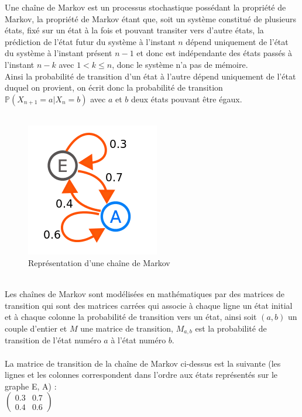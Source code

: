 \documentclass[final, 10pt]{report}
\begin{document}
Une chaîne de Markov est un processus stochastique possédant la propriété de Markov, la propriété de Markov étant que, soit un système constitué de plusieurs états, fixé sur un état à la fois et pouvant transiter vers d'autre états, la prédiction de l'état futur du système à l'instant $n$ dépend uniquement de l'état du système à l'instant présent $n-1$ et donc est indépendante des états passés à l'instant $n-k$ avec $1<k\leq n$, donc le système n'a pas de mémoire.\\
Ainsi la probabilité de transition d'un état à l'autre dépend uniquement de l'état duquel on provient, on écrit donc la probabilité de transition $\mathbb{P}(X_{n+1}=a | X_{n}=b)$ avec $a$ et $b$ deux états pouvant être égaux.\\
\\
\begin{figure}[!h]
    \centering
    \includegraphics[scale=0.5]{img/markovChaine.png}
    \caption{Représentation d'une chaîne de Markov}
    \label{fig:chaine_markov}
\end{figure}
\\
Les chaînes de Markov sont modélisées en mathématiques par des matrices de transition qui sont des matrices carrées qui associe à chaque ligne un état initial et à chaque colonne la probabilité de transition vers un état, ainsi soit $(a,b)$ un couple d'entier et $M$ une matrice de transition, $M_{a,b}$ est la probabilité de transition de l'état numéro $a$ à l'état numéro $b$.\\
\\
La matrice de transition de la chaîne de Markov ci-dessus est la suivante (les lignes et les colonnes correspondent dans l'ordre aux états représentés sur le graphe E, A) : 
\\
$\begin{pmatrix}
0.3 & 0.7 \\
0.4 & 0.6
\end{pmatrix}$\\
\end{document}
